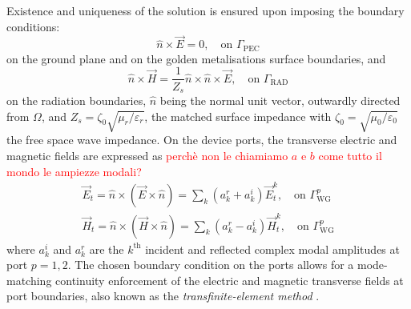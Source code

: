 \documentclass[AMA,STIX2COL]{WileyNJD-v2}
\begin{document}
Existence and uniqueness of the solution is ensured upon imposing the boundary conditions:
%
\begin{equation}
\label{eq:bcpec}
\hat{n} \times \vec{E} = 0, \quad \text{on } \Gamma_\text{PEC}
\end{equation}
%
\noindent on the ground plane and on the golden metalisations surface boundaries, and
%
\begin{equation}
\label{eq:bcrad}
\hat{n} \times \vec{H} =  \frac{1}{Z_s} \hat{n}\times\hat{n}\times \vec{E}, \quad \text{on } \Gamma_\text{RAD}
\end{equation}
%
\noindent on the radiation boundaries, $\hat{n}$ being the normal unit vector, outwardly directed from $\Omega$, and $Z_s = \zeta_0 \sqrt{{\mu_r}/{\varepsilon_r}}$, the matched surface impedance with $\zeta_0 = \sqrt{{\mu_0}/{\varepsilon_0}}$ the free space wave impedance. On the device ports, the transverse electric and magnetic fields are expressed as \textcolor{red}{ perchè non le chiamiamo $a$ e $b$ come tutto il mondo le ampiezze modali?}
\begin{equation}
\label{eq:bcport}
\begin{aligned}
{\vec{E}}_t = \hat{n} \times ( {\vec{E}} \times \hat{n})  = \sum_{k} \left ( a_{k}^r + a_{k}^i \right ) \vec{E}_t^k, \quad \text{on } \Gamma_\text{WG}^p \\
{\vec{H}}_t = \hat{n} \times ( {\vec{H}} \times \hat{n}) = \sum_{k} \left ( a_{k}^r - a_{k}^i \right ) \vec{H}_t^k, \quad \text{on } \Gamma_\text{WG}^p
\end{aligned}
\end{equation}
\noindent where $a_k^i$ and $a_k^r$ are the $k^\text{th}$ incident and reflected complex modal amplitudes at port $p=1,2$. The chosen boundary condition on the ports allows for a mode-matching continuity enforcement of the electric and magnetic transverse fields at port boundaries, also known as the \emph{transfinite-element method} \cite{cendes1988transfinite}.
\end{document}
